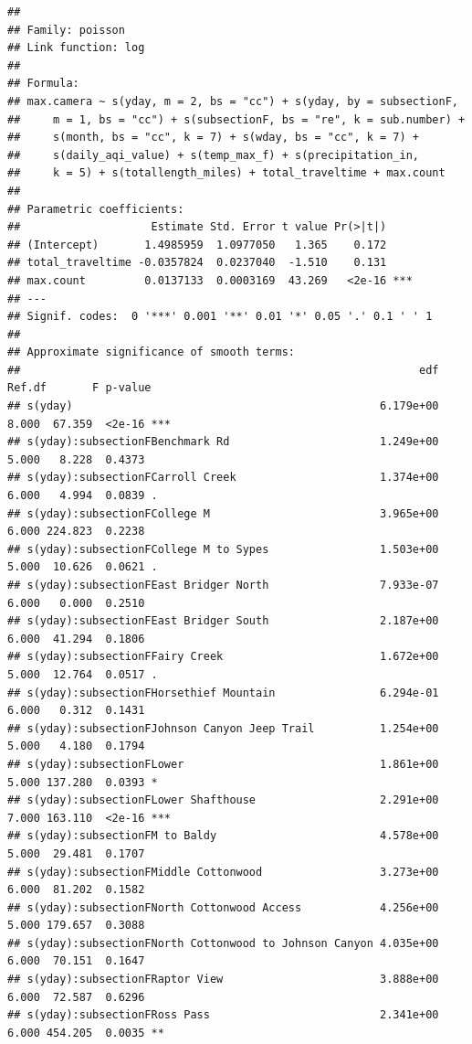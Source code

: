 \documentclass[
]{book}
\begin{document}
\begin{verbatim}
## 
## Family: poisson 
## Link function: log 
## 
## Formula:
## max.camera ~ s(yday, m = 2, bs = "cc") + s(yday, by = subsectionF, 
##     m = 1, bs = "cc") + s(subsectionF, bs = "re", k = sub.number) + 
##     s(month, bs = "cc", k = 7) + s(wday, bs = "cc", k = 7) + 
##     s(daily_aqi_value) + s(temp_max_f) + s(precipitation_in, 
##     k = 5) + s(totallength_miles) + total_traveltime + max.count
## 
## Parametric coefficients:
##                    Estimate Std. Error t value Pr(>|t|)    
## (Intercept)       1.4985959  1.0977050   1.365    0.172    
## total_traveltime -0.0357824  0.0237040  -1.510    0.131    
## max.count         0.0137133  0.0003169  43.269   <2e-16 ***
## ---
## Signif. codes:  0 '***' 0.001 '**' 0.01 '*' 0.05 '.' 0.1 ' ' 1
## 
## Approximate significance of smooth terms:
##                                                             edf Ref.df       F p-value    
## s(yday)                                               6.179e+00  8.000  67.359  <2e-16 ***
## s(yday):subsectionFBenchmark Rd                       1.249e+00  5.000   8.228  0.4373    
## s(yday):subsectionFCarroll Creek                      1.374e+00  6.000   4.994  0.0839 .  
## s(yday):subsectionFCollege M                          3.965e+00  6.000 224.823  0.2238    
## s(yday):subsectionFCollege M to Sypes                 1.503e+00  5.000  10.626  0.0621 .  
## s(yday):subsectionFEast Bridger North                 7.933e-07  6.000   0.000  0.2510    
## s(yday):subsectionFEast Bridger South                 2.187e+00  6.000  41.294  0.1806    
## s(yday):subsectionFFairy Creek                        1.672e+00  5.000  12.764  0.0517 .  
## s(yday):subsectionFHorsethief Mountain                6.294e-01  6.000   0.312  0.1431    
## s(yday):subsectionFJohnson Canyon Jeep Trail          1.254e+00  5.000   4.180  0.1794    
## s(yday):subsectionFLower                              1.861e+00  5.000 137.280  0.0393 *  
## s(yday):subsectionFLower Shafthouse                   2.291e+00  7.000 163.110  <2e-16 ***
## s(yday):subsectionFM to Baldy                         4.578e+00  5.000  29.481  0.1707    
## s(yday):subsectionFMiddle Cottonwood                  3.273e+00  6.000  81.202  0.1582    
## s(yday):subsectionFNorth Cottonwood Access            4.256e+00  5.000 179.657  0.3088    
## s(yday):subsectionFNorth Cottonwood to Johnson Canyon 4.035e+00  6.000  70.151  0.1647    
## s(yday):subsectionFRaptor View                        3.888e+00  6.000  72.587  0.6296    
## s(yday):subsectionFRoss Pass                          2.341e+00  6.000 454.205  0.0035 ** 

\end{verbatim}
\end{document}
